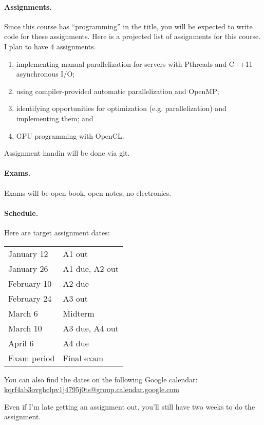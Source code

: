 \documentclass{article}
\begin{document}
\paragraph{Assignments.} Since this course has ``programming'' in the 
title, you will be expected to write code for these assignments.  Here
is a projected list of assignments for this course. I plan to have 4
assignments.
\begin{enumerate}
\item implementing manual parallelization for servers with Pthreads and C++11 asynchronous I/O;
\item using compiler-provided automatic parallelization and OpenMP;
\item identifying opportunities for optimization (e.g. parallelization) and implementing them; and
\item GPU programming with OpenCL.
\end{enumerate}
Assignment handin will be done via git.

\paragraph{Exams.} Exams will be open-book, open-notes, no electronics.

\paragraph{Schedule.} 
Here are target assignment dates:

\begin{tabular}{ll}
January 12  & A1 out\\
January 26  & A1 due, A2 out\\
February 10 & A2 due\\
February 24 & A3 out\\
March 6 & Midterm\\
March 10    & A3 due, A4 out\\
April 6    & A4 due\\
Exam period & Final exam
\end{tabular}

\noindent
You can also find the dates on the following Google calendar:\\
\hspace*{3em}\url{kqrf4ab3ovghclpv1j4795j0ts@group.calendar.google.com}

\noindent Even if I'm late getting an assignment out, you'll still have two weeks to do the assignment. 
\end{document}
